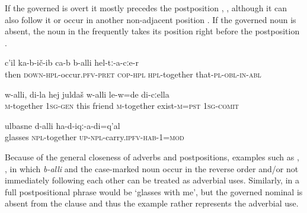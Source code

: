 If the governed  is overt it mostly precedes the postposition , , although it can also follow it  or occur in another non-adjacent position . If the governed noun is absent, the noun in the  frequently takes its position right before the postposition .
%
\begin{exe}
	\ex
	\begin{xlist}
		\ex	\label{Then the ran together with them}
		\gll	c'il	ka-b-ič-ib	ca-b	b-alli	hel-tː-a-cːe-r   \\
			then	\textsc{down-hpl}-occur.\textsc{pfv}-\textsc{pret}	\textsc{cop-hpl}	\textsc{hpl}-together	that-\textsc{pl}-\textsc{obl}-\textsc{in}-\textsc{abl}\\
		\glt	{}

		\ex	\label{Myfriend was together with me}
		\gll	w-alli,	di-la	hej	juldaš	w-alli	le-w=de	di-cːella\\
			\textsc{m}-together	1\textsc{sg}-\textsc{gen}	this	friend	\textsc{m}-together	exist-\textsc{m}=\textsc{pst}	1\textsc{sg}-\textsc{comit}\\
		\glt	{}

		\ex	\label{If I had known that I will look at picture}
		\gll	ulbasne	d-alli	ha-d-iqː-a-di=q'al\\
			glasses	\textsc{npl}-together	\textsc{up}-\textsc{npl}-carry.\textsc{ipfv}-\textsc{hab}-1=\textsc{mod}\\
		\glt	{}
	\end{xlist}
\end{exe}

Because of the general closeness of adverbs and postpositions, examples such as , , in which \textit{b-alli} and the case-marked noun occur in the reverse order and/or not immediately following each other can be treated as adverbial uses. Similarly, in  a full postpositional phrase would be `glasses with me', but the governed nominal is absent from the clause and thus the example rather represents the adverbial use.

